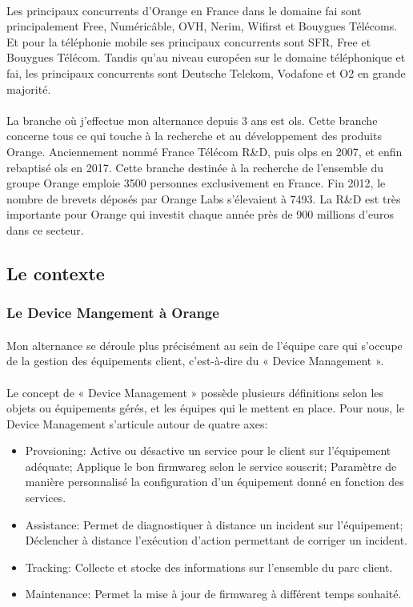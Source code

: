 \documentclass[12pt,a4paper]{report}
\begin{document}
\paragraph*{}
Les principaux concurrents d'Orange en France dans le domaine \gls{fai} sont principalement Free, Numéricâble, OVH, Nerim, Wifirst et Bouygues Télécoms. Et pour la téléphonie mobile ses principaux concurrents sont SFR, Free et Bouygues Télécom. Tandis qu'au niveau européen sur le domaine téléphonique et \gls{fai}, les principaux concurrents sont Deutsche Telekom, Vodafone et O2 en grande majorité.
\paragraph*{}
La branche où j’effectue mon alternance depuis 3 ans est \gls{ols}. Cette branche concerne tous ce qui touche à la recherche et au développement des produits Orange. Anciennement nommé France Télécom R\&D, puis \gls{olps} en 2007, et enfin rebaptisé \gls{ols} en 2017. Cette branche destinée à la recherche de l’ensemble du groupe Orange emploie 3500 personnes exclusivement en France. Fin 2012, le nombre de brevets déposés par Orange Labs s’élevaient à 7493. La R\&D est très importante pour Orange qui investit chaque année près de 900 millions d’euros dans ce secteur. \\

\subsection{Le contexte}
\subsubsection{Le Device Mangement à Orange}
\paragraph*{}
Mon alternance se déroule plus précisément au sein de l’équipe \gls{care}  qui s’occupe de la gestion des équipements client, c’est-à-dire du « Device Management ».
\paragraph*{}
Le concept de « Device Management » possède plusieurs définitions selon les objets ou équipements gérés, et les équipes qui le mettent en place. Pour nous, le Device Management s'articule autour de quatre axes:
\begin{itemize}
\subparagraph*{}
\item Provsioning: Active ou désactive un service pour le client sur l'équipement adéquate; Applique le bon \gls{firmwareg} selon le service souscrit; Paramètre de manière personnalisé la configuration d'un équipement donné en fonction des services.
\item Assistance: Permet de diagnostiquer à distance un incident sur l'équipement; Déclencher à distance l'exécution d'action permettant de corriger un incident.
\item Tracking: Collecte et stocke des informations sur l'ensemble du parc client.
\item Maintenance: Permet la mise à jour de \gls{firmwareg} à différent temps souhaité.
\end{itemize}
\end{document}
